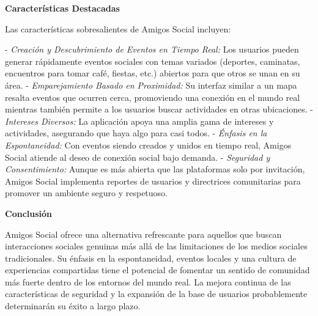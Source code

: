 \textbf{Características Destacadas}

Las características sobresalientes de Amigos Social incluyen:

- \textit{Creación y Descubrimiento de Eventos en Tiempo Real:} Los usuarios pueden generar rápidamente eventos sociales con temas variados (deportes, caminatas, encuentros para tomar café, fiestas, etc.) abiertos para que otros se unan en su área.
- \textit{Emparejamiento Basado en Proximidad:} Su interfaz similar a un mapa resalta eventos que ocurren cerca, promoviendo una conexión en el mundo real mientras también permite a los usuarios buscar actividades en otras ubicaciones.
- \textit{Intereses Diversos:} La aplicación apoya una amplia gama de intereses y actividades, asegurando que haya algo para casi todos.
- \textit{Énfasis en la Espontaneidad:} Con eventos siendo creados y unidos en tiempo real, Amigos Social atiende al deseo de conexión social bajo demanda.
- \textit{Seguridad y Consentimiento:} Aunque es más abierta que las plataformas solo por invitación, Amigos Social implementa reportes de usuarios y directrices comunitarias para promover un ambiente seguro y respetuoso.

\textbf{Conclusión}

Amigos Social ofrece una alternativa refrescante para aquellos que buscan interacciones sociales genuinas más allá de las limitaciones de los medios sociales tradicionales. Su énfasis en la espontaneidad, eventos locales y una cultura de experiencias compartidas tiene el potencial de fomentar un sentido de comunidad más fuerte dentro de los entornos del mundo real. La mejora continua de las características de seguridad y la expansión de la base de usuarios probablemente determinarán su éxito a largo plazo.
